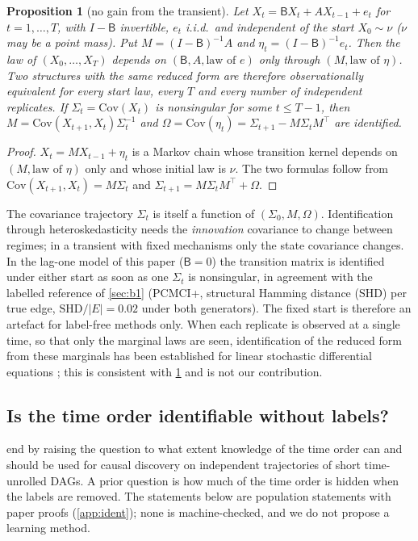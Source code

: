 \documentclass[pdflatex,sn-apa]{sn-jnl}
\theoremstyle{thmstyleone}
\newtheorem{proposition}[theorem]{Proposition}
\theoremstyle{thmstylethree}
\theoremstyle{thmstyletwo}
\newcommand{\nolean}[1]{\par\noindent{\footnotesize\textsf{Lean:}~not machine-checked (#1).}\par}
\begin{document}
\begin{proposition}[no gain from the transient]\label{prop:nogain}
Let $X_t=\mathsf BX_t+AX_{t-1}+e_t$ for $t=1,\dots,T$, with $I-\mathsf B$
invertible, $e_t$ i.i.d.\ and independent of the start $X_0\sim\nu$ ($\nu$ may
be a point mass). Put $M=(I-\mathsf B)^{-1}A$ and $\eta_t=(I-\mathsf B)^{-1}e_t$.
Then the law of $(X_0,\dots,X_T)$ depends on $(\mathsf B,A,\text{law of }e)$
only through $(M,\text{law of }\eta)$. Two structures with the same reduced
form are therefore observationally equivalent for every start law, every $T$
and every number of independent replicates. If $\Sigma_t=\mathrm{Cov}(X_t)$ is
nonsingular for some $t\le T-1$, then $M=\mathrm{Cov}(X_{t+1},X_t)\Sigma_t^{-1}$
and $\Omega=\mathrm{Cov}(\eta_t)=\Sigma_{t+1}-M\Sigma_tM^\top$ are identified.
\nolean{paper proof}
\end{proposition}
\begin{proof}
$X_t=MX_{t-1}+\eta_t$ is a Markov chain whose transition kernel depends on
$(M,\text{law of }\eta)$ only and whose initial law is $\nu$. The two formulas
follow from $\mathrm{Cov}(X_{t+1},X_t)=M\Sigma_t$ and
$\Sigma_{t+1}=M\Sigma_tM^\top+\Omega$.
\end{proof}
The covariance trajectory $\Sigma_t$ is itself a function of
$(\Sigma_0,M,\Omega)$. Identification through heteroskedasticity
\citep{rigobon2003identification} needs the \emph{innovation} covariance to
change between regimes; in a transient with fixed mechanisms only the state
covariance changes. In the lag-one model of this paper ($\mathsf B=0$) the
transition matrix is identified under either start as soon as one $\Sigma_t$
is nonsingular, in agreement with the labelled reference of \cref{sec:b1} (PCMCI+,
structural Hamming distance (SHD) per true edge, $\mathrm{SHD}/|E|=0.02$ under both generators). The fixed start is therefore an
artefact for label-free methods only. When each replicate is observed at a
single time, so that only the marginal laws are seen, identification of the
reduced form from these marginals has been established for linear stochastic
differential equations \citep{wang2023generator,guan2026identifying}; this is
consistent with \cref{prop:nogain} and is not our contribution.

\subsection{Is the time order identifiable without labels?}
\label{sec:ident}

\citet{reisach2026topological} end by raising the question to what extent
knowledge of the time order can and should be used for causal discovery on
independent trajectories of short time-unrolled DAGs. A prior question is how
much of the time order is hidden when the labels are removed. The statements
below are population statements with paper proofs (\cref{app:ident}); none is
machine-checked, and we do not propose a learning method.
\end{document}

